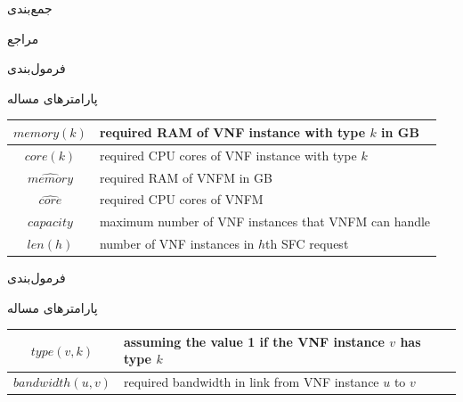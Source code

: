 \documentclass{beamer}
\begin{document}
\begin{persian}
\begin{frame}{جمع‌بندی}
\end{frame}
\begin{frame}[shrink=25]{مراجع}
    \begin{latin}
        \printbibliography[heading=none]
    \end{latin}
\end{frame}
\begin{frame}{فرمول‌بندی}
    \par پارامترهای مساله
    \begin{center}\begin{latin}\begin{tabular}{|c|p{5cm}|}
        \hline
        \(memory(k)\) & required RAM of VNF instance with type \(k\) in GB \\
        \hline
        \(core(k)\) & required CPU cores of VNF instance with type \(k\) \\
        \hline
        \(\hat{memory}\) & required RAM of VNFM in GB \\
        \hline
        \(\hat{core}\) & required CPU cores of VNFM \\
        \hline
        \(capacity\) & maximum number of VNF instances that VNFM can handle \\
        \hline
        \(len(h)\) & number of VNF instances in \(h\)th SFC request \\
        \hline
    \end{tabular}\end{latin}\end{center}
\end{frame}
\begin{frame}{فرمول‌بندی}
    \par پارامترهای مساله
    \begin{center}\begin{latin}\begin{tabular}{|c|p{5cm}|}
        \hline
        \(type(v, k)\) & assuming the value 1 if the VNF instance \(v\) has type \(k\)  \\
        \hline
        \(bandwidth(u, v)\) & required bandwidth in link from VNF instance \(u\) to \(v\) \\

\end{tabular}
\end{latin}
\end{center}
\end{frame}
\end{persian}
\end{document}
